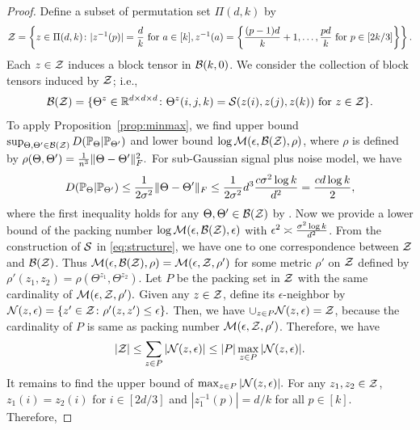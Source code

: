 \documentclass[12pt]{article}
\theoremstyle{definition}
\begin{document}
\begin{proof}
Define a subset of permutation set $\Pi(d,k)$ by
\begin{align}
    \mathcal{Z} = \left\{z\in \Pi(d,k)\colon |z^{-1}(p)| = \frac{d}{k} \text{ for } a\in[k], z^{-1}(a) = \left\{\frac{(p-1)d}{k}+1,\ldots,\frac{pd}{k} \text{ for } p\in[2k/3]\right\}\right\}.
\end{align}
Each $z\in\mathcal{Z}$ induces a block tensor in $\mathcal{B}(k,0)$. We consider the collection of block tensors induced by $\mathcal{Z}$; i.e.,
\begin{align}
    \mathcal{B}(\mathcal{Z}) = \{\Theta^z\in\mathbb{R}^{d\times d\times d}\colon \Theta^z(i,j,k) = \mathcal{S}(z(i),z(j),z(k)) \text{ for } z\in\mathcal{Z}\}.
\end{align}
To apply Proposition~\ref{prop:minmax}, we find upper bound $\sup_{\Theta,\Theta'\in\mathcal{B}(\mathcal{Z})}D(\mathbb{P}_\Theta|\mathbb{P}_{\Theta'})$ and lower bound $\log \mathcal{M}(\epsilon,\mathcal{B}(\mathcal{Z}),\rho)$, where $\rho$ is defined by 
$\rho(\Theta,\Theta') = \frac{1}{n^3}\lVert\Theta-\Theta'\rVert_F^2.$
For sub-Gaussian signal plus noise model, we have
\begin{align}\label{eq:kldistance}
    D(\mathbb{P}_\Theta|\mathbb{P}_{\Theta'})\leq \frac{1}{2\sigma^2}\lVert\Theta-\Theta'\rVert_F\leq \frac{1}{2\sigma^2}d^3 \frac{c\sigma^2\log k}{d^2}=\frac{cd\log k}{2},
\end{align}where the first inequality holds for any $\Theta,\Theta'\in\mathcal{B}(\mathcal{Z})$ by \citet[Proposition 4.2]{gao2015rate}. Now we provide a lower bound of the packing number $\log \mathcal{M}(\epsilon,\mathcal{B}(\mathcal{Z}),\epsilon)$ with $\epsilon^2 \asymp {\sigma^2\log k \over d^2}$. From the construction of $\mathcal{S}$ in \eqref{eq:structure}, we have one to one correspondence between $\mathcal{Z}$ and $\mathcal{B}(\mathcal{Z})$. Thus $\mathcal{M}(\epsilon,\mathcal{B}(\mathcal{Z}),\rho) = \mathcal{M}(\epsilon,\mathcal{Z},\rho')$ for some metric $\rho'$ on $\mathcal{Z}$ defined by $\rho'(z_1,z_2) = \rho(\Theta^{z_1},\Theta^{z_2})$. Let $P$ be the packing set in $\mathcal{Z}$ with the same cardinality of $\mathcal{M}(\epsilon,\mathcal{Z},\rho').$ Given any $z\in\mathcal{Z}$, define its $\epsilon$-neighbor by $\mathcal{N}(z,\epsilon) = \{z'\in\mathcal{Z}\colon \rho'(z,z')\leq \epsilon\}.$ Then, we have $\cup_{z\in P} \mathcal{N}(z,\epsilon) = \mathcal{Z}$, because the cardinality of $P$ is same as packing number $\mathcal{M}(\epsilon,\mathcal{Z},\rho')$. Therefore, we have
\begin{align}\label{eq:packing}
    |\mathcal{Z}|\leq\sum_{z\in P}|\mathcal{N}(z,\epsilon)|\leq |P|\max_{z\in P}|\mathcal{N}(z,\epsilon)|.
\end{align}
It remains to find the upper bound of $\max_{z\in P}|\mathcal{N}(z,\epsilon)|.$ For any $z_1,z_2\in\mathcal{Z}$, $z_1(i) = z_2(i)$ for $i\in[2d/3]$ and $|z_1^{-1}(p)| = d/k$ for all $p\in[k].$ Therefore,

\end{proof}
\end{document}
